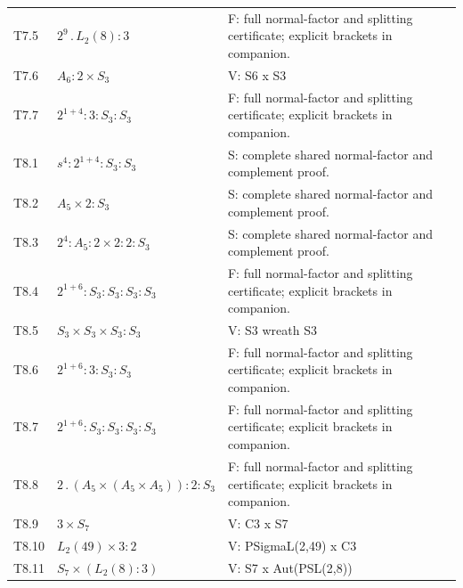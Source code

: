 \begin{longtable}{@{}lp{.40\linewidth}>{\raggedright\arraybackslash}p{.46\linewidth}@{}}
T7.5 & $2^9 \mathbin{.} L_{2}(8) : 3$ & F: full normal-factor and splitting certificate; explicit brackets in companion.\\
T7.6 & $A_{6} : 2 \times S_{3}$ & V: S6 x S3\\
T7.7 & $2^{1+4} : 3 : S_{3} : S_{3}$ & F: full normal-factor and splitting certificate; explicit brackets in companion.\\
T8.1 & $s^4 : 2^{1+4} : S_{3} : S_{3}$ & S: complete shared normal-factor and complement proof.\\
T8.2 & $A_{5} \times 2 : S_{3}$ & S: complete shared normal-factor and complement proof.\\
T8.3 & $2^4 : A_{5} : 2 \times 2 : 2 : S_{3}$ & S: complete shared normal-factor and complement proof.\\
T8.4 & $2^{1+6} : S_{3} : S_{3} : S_{3} : S_{3}$ & F: full normal-factor and splitting certificate; explicit brackets in companion.\\
T8.5 & $S_{3} \times S_{3} \times S_{3} : S_{3}$ & V: S3 wreath S3\\
T8.6 & $2^{1+6} : 3 : S_{3} : S_{3}$ & F: full normal-factor and splitting certificate; explicit brackets in companion.\\
T8.7 & $2^{1+6} : S_{3} : S_{3} : S_{3} : S_{3}$ & F: full normal-factor and splitting certificate; explicit brackets in companion.\\
T8.8 & $2 \mathbin{.} (A_{5} \times (A_{5} \times A_{5})) : 2 : S_{3}$ & F: full normal-factor and splitting certificate; explicit brackets in companion.\\
T8.9 & $3 \times S_{7}$ & V: C3 x S7\\
T8.10 & $L_{2}(49) \times 3 : 2$ & V: PSigmaL(2,49) x C3\\
T8.11 & $S_{7} \times (L_{2}(8) : 3)$ & V: S7 x Aut(PSL(2,8))\\
\bottomrule\end{longtable}
